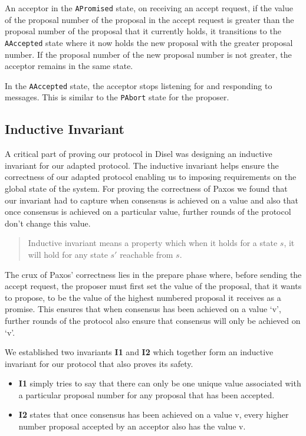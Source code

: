 An acceptor in the \texttt{APromised} state, on receiving an accept request, if
the value of the proposal number of the proposal in the accept request is greater than
the proposal number of the proposal that it currently holds, it transitions to the
\texttt{AAccepted} state where it now holds the new proposal with the greater
proposal number. If the proposal number of the new proposal number is not greater,
the acceptor remains in the same state.

In the \texttt{AAccepted} state, the acceptor stops listening for and responding
to messages. This is similar to the \texttt{PAbort} state for the proposer.


\subsection{Inductive Invariant}
A critical part of proving our protocol in Disel was designing an inductive invariant
for our adapted protocol. The inductive invariant helps ensure the correctness of
our adapted protocol enabling us to imposing requirements on the global state of the system.
For proving the correctness of Paxos we found that our invariant had to capture
when consensus is achieved on a value and also that once consensus is achieved
on a particular value, further rounds of the protocol don’t change this value.

\begin{quote}
Inductive invariant means a property which when it holds for a state $s$,
it will hold for any state $s'$ reachable from $s$.
\end{quote}

The crux of Paxos' correctness lies in the prepare phase where, before sending
the accept request, the proposer must first set the value of the proposal, that
it wants to propose, to be the value of the highest numbered proposal it receives
as a promise. This ensures that when consensus has been achieved on a value `v',
further rounds of the protocol also ensure that consensus will only be achieved on `v'.

We established two invariants \textbf{I1} and \textbf{I2} which together form an inductive
invariant for our protocol that also proves its safety.

\begin{itemize}
  \item \textbf{I1} simply tries to say that there can only be one unique value
    associated with a particular proposal number for any proposal that has been accepted.
  \item \textbf{I2} states that once consensus has been achieved on a value v,
    every higher number proposal accepted by an acceptor also has the value v.
\end{itemize}


